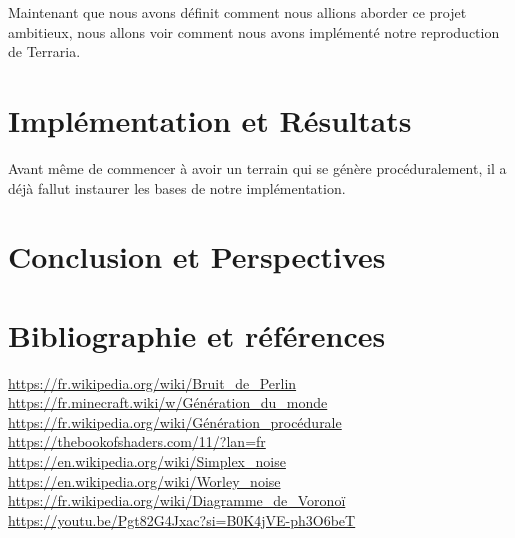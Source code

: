 \documentclass{article}
\begin{document}
Maintenant que nous avons définit comment nous allions aborder ce projet ambitieux, nous allons voir comment nous avons implémenté notre reproduction de Terraria.
\section{Implémentation et Résultats}
\label{Implémentation}

Avant même de commencer à avoir un terrain qui se génère procéduralement, il a déjà fallut instaurer les bases de notre implémentation.
\section{Conclusion et Perspectives}

\section{Bibliographie et références}


\url{https://fr.wikipedia.org/wiki/Bruit_de_Perlin}\\
\url{https://fr.minecraft.wiki/w/Génération_du_monde}\\
\url{https://fr.wikipedia.org/wiki/Génération_procédurale}\\
\url{https://thebookofshaders.com/11/?lan=fr}\\
\url{https://en.wikipedia.org/wiki/Simplex_noise}\\
\url{https://en.wikipedia.org/wiki/Worley_noise}\\
\url{https://fr.wikipedia.org/wiki/Diagramme_de_Voronoï}\\
\url{https://youtu.be/Pgt82G4Jxac?si=B0K4jVE-ph3O6beT}
\end{document}
